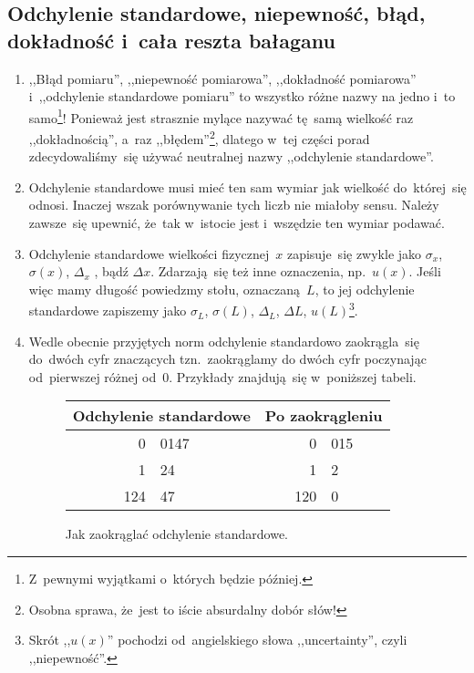 \documentclass[a4paper,11pt]{article}
\begin{document}
\subsection{Odchylenie standardowe, niepewność, błąd, dokładność
  i~cała reszta bałaganu}
\label{sec:odchylenie}

\begin{enumerate}
\item ,,Błąd pomiaru'', ,,niepewność pomiarowa'', ,,dokładność
  pomiarowa'' i~,,odchylenie standardowe pomiaru'' to wszystko różne
  nazwy na jedno i~to samo\footnote{Z~pewnymi wyjątkami o~których
    będzie później.}! Ponieważ jest strasznie mylące nazywać tę~samą
  wielkość raz ,,dokładnością'', a~raz ,,błędem''\footnote{Osobna
    sprawa, że~jest to iście absurdalny dobór słów!}, dlatego w~tej
  części porad zdecydowaliśmy~się używać neutralnej nazwy ,,odchylenie
  standardowe''.
\item Odchylenie standardowe musi mieć ten sam wymiar jak wielkość
  do~której~się odnosi. Inaczej wszak porównywanie tych liczb nie
  miałoby sensu. Należy zawsze~się upewnić, że~tak w~istocie jest
  i~wszędzie ten wymiar podawać.
\item Odchylenie standardowe wielkości fizycznej~$x$ zapisuje~się
  zwykle jako $\sigma_{ x }$, $\sigma( x )$, $\Delta_{ x }$ , bądź
  $\Delta x$. Zdarzają~się też inne oznaczenia, np.~$u( x )$. Jeśli
  więc mamy długość powiedzmy stołu, oznaczaną~$L$, to jej odchylenie
  standardowe zapiszemy jako $\sigma_{ L }$, $\sigma( L )$,
  $\Delta_{ L }$, $\Delta L$, $u( L )$\footnote{Skrót ,,$u( x )$''
    pochodzi od~angielskiego słowa ,,uncertainty'', czyli
    ,,niepewność''.}.
\item Wedle obecnie przyjętych norm odchylenie standardowo
  zaokrągla~się do~dwóch cyfr znaczących tzn.~zaokrąglamy do dwóch
  cyfr poczynając od~pierwszej różnej od~0. Przykłady znajdują~się
  w~poniższej tabeli.
  \begin{figure}[h]
    \centering
    \begin{tabular}[h]{|r @{.} l |r @{.} l|}
      \hline
      \multicolumn{2}{|c}{Odchylenie standardowe}
      & \multicolumn{2}{|c|}{Po zaokrągleniu} \\
      \hline
      0&0147 & 0&015 \\
      1&24   & 1&2 \\
      124&47 & 120&0 \\
      \hline
    \end{tabular}
    \caption{Jak zaokrąglać odchylenie standardowe.}

\end{figure}
\end{enumerate}
\end{document}
